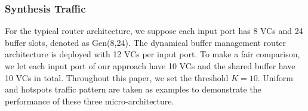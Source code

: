 \documentclass[10pt,conference]{IEEEtran}
\begin{document}
\subsubsection{Synthesis Traffic}
For the typical router architecture, we suppose each input port has 8 VCs and 24 buffer slots, denoted as Gen(8,24). The dynamical buffer management router architecture is deployed with 12 VCs per input port. To make a fair comparison, we let each input port of our approach have 10 VCs and the shared buffer have 10 VCs in total. Throughout this paper, we set the threshold $K=10$. Uniform and hotspots traffic pattern are taken as examples to demonstrate the performance of these three micro-architecture.

\end{document}
